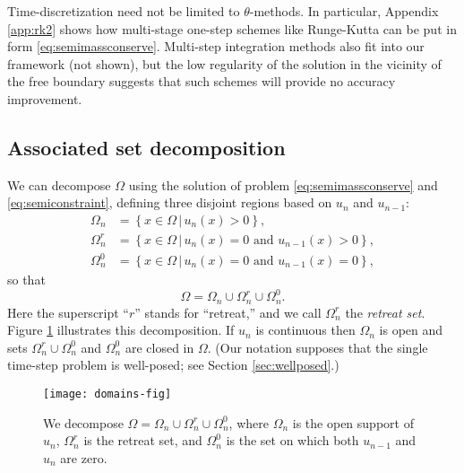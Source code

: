 \documentclass[final,onefignum]{siamart190516}
\begin{document}
Time-discretization need not be limited to $\theta$-methods.  In particular, Appendix \ref{app:rk2} shows how multi-stage one-step schemes like Runge-Kutta can be put in form \eqref{eq:semimassconserve}.  Multi-step integration methods also fit into our framework (not shown), but the low regularity of the solution in the vicinity of the free boundary suggests that such schemes will provide no accuracy improvement.

\subsection{Associated set decomposition}  \label{subsec:setdecompose}  We can decompose $\Omega$ using the solution of problem \eqref{eq:semimassconserve} and \eqref{eq:semiconstraint}, defining three disjoint regions based on $u_n$ and $u_{n-1}$:
\begin{align*}
\Omega_n &= \left\{x \in \Omega \,\big|\, u_n(x)>0\right\}, \\
\Omega_n^r &= \left\{x \in \Omega \,\big|\, u_n(x)=0 \text{ and } u_{n-1}(x) > 0\right\}, \\
\Omega_n^0 &= \left\{x \in \Omega \,\big|\, u_n(x)=0 \text{ and } u_{n-1}(x) = 0\right\},
\end{align*}
so that
\begin{equation}
\Omega = \Omega_n \cup \Omega_n^r \cup \Omega_n^0.  \label{eq:omegadecomposition}
\end{equation}
Here the superscript ``$r$'' stands for ``retreat,'' and we call $\Omega_n^r$ the \emph{retreat set}.  Figure \ref{fig:domains} illustrates this decomposition.  If $u_n$ is continuous then $\Omega_n$ is open and sets $\Omega_n^r \cup \Omega_n^0$ and $\Omega_n^0$ are closed in $\Omega$.  (Our notation supposes that the single time-step problem is well-posed; see Section \ref{sec:wellposed}.)

\begin{figure}[ht]
\medskip
\begin{center}
\texttt{[image: domains-fig]}
\end{center}
\caption{We decompose $\Omega = \Omega_n \cup \Omega_n^r \cup \Omega_n^0$, where $\Omega_n$ is the open support of $u_n$, $\Omega_n^r$ is the retreat set, and $\Omega_n^0$ is the set on which both $u_{n-1}$ and $u_n$ are zero.}
\label{fig:domains}
\end{figure}
\end{document}
